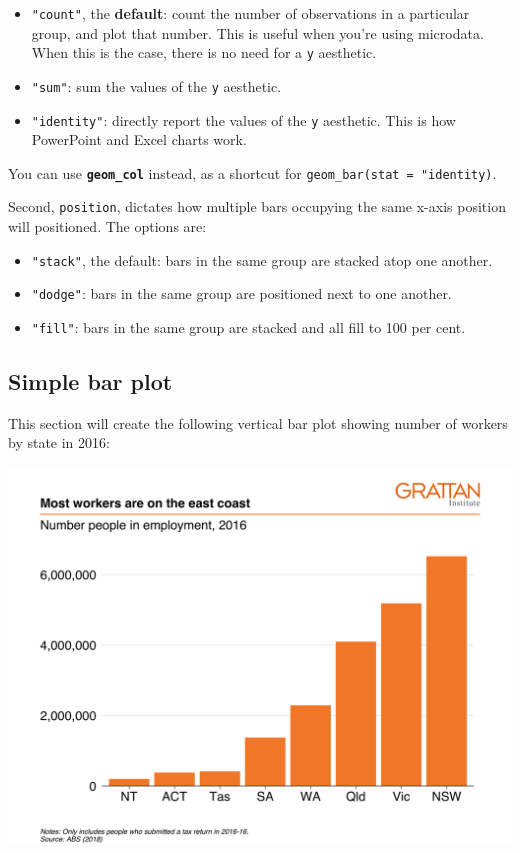 \documentclass[
]{book}
\providecommand{\tightlist}{%
  \setlength{\itemsep}{0pt}\setlength{\parskip}{0pt}}
\begin{document}
\begin{itemize}
\tightlist
\item
  \texttt{"count"}, the \textbf{default}: count the number of observations in a particular group, and plot that number. This is useful when you're using microdata. When this is the case, there is no need for a \texttt{y} aesthetic.
\item
  \texttt{"sum"}: sum the values of the \texttt{y} aesthetic.
\item
  \texttt{"identity"}: directly report the values of the \texttt{y} aesthetic. This is how PowerPoint and Excel charts work.
\end{itemize}

You can use \textbf{\texttt{geom\_col}} instead, as a shortcut for \texttt{geom\_bar(stat\ =\ "identity)}.

Second, \texttt{position}, dictates how multiple bars occupying the same x-axis position will positioned. The options are:

\begin{itemize}
\tightlist
\item
  \texttt{"stack"}, the default: bars in the same group are stacked atop one another.
\item
  \texttt{"dodge"}: bars in the same group are positioned next to one another.
\item
  \texttt{"fill"}: bars in the same group are stacked and all fill to 100 per cent.
\end{itemize}

\hypertarget{simple-bar-plot}{%
\subsection{Simple bar plot}\label{simple-bar-plot}}

This section will create the following vertical bar plot showing number of workers by state in 2016:

\includegraphics[width=44.44in]{atlas/simple_bar}
\end{document}
